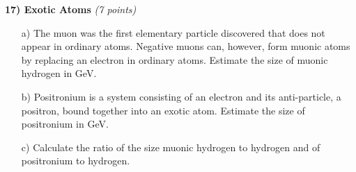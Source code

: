 \clearpage
\textbf{17) Exotic Atoms } \hfill \textit{(7 points)}\\
\begin{itemize}
\item[a)]{
The muon was the first elementary particle discovered that does not appear in ordinary atoms.
Negative muons can, however, form muonic atoms by replacing an electron in ordinary atoms. 
Estimate the size of muonic hydrogen in GeV.  }
\vspace*{1.5in}
\item[b)]{
Positronium is a system consisting of an electron and its anti-particle, a positron, bound together into an exotic atom.
Estimate the size of positronium in GeV. 
}
\vspace*{1.5in}
\item[c)]{
Calculate the ratio of the size muonic hydrogen to hydrogen and of positronium to hydrogen.
}
\end{itemize}
